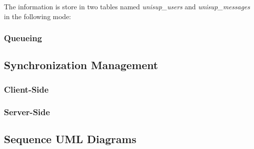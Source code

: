 The information is store in two tables named \textit{unisup\_users} and \textit{unisup\_messages} in the following mode:


\subsubsection{Queueing}

\subsection{Synchronization Management}
\subsubsection{Client-Side}
\subsubsection{Server-Side}

\subsection{Sequence UML Diagrams}